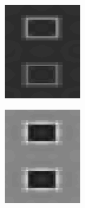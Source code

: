 \documentclass[journal,onecolumn]{IEEEtran}
\begin{document}
{\begin{figure}[H]
\begin{subfigure}[b]{0.2\textwidth}
            \caption{}
            \label{fig:test-crisp-dwt-1-rg}
    \end{subfigure}%
    \begin{subfigure}[b]{0.2\textwidth}
            \centering
            \includegraphics[width=.85\linewidth, frame]{test-crisp-dwt-2-rg}
            \caption{}
            \label{fig:test-crisp-dwt-2-rg}
    \end{subfigure}%
    \begin{subfigure}[b]{0.2\textwidth}
            \centering
            \includegraphics[width=.85\linewidth, frame]{test-crisp-dwt-3-rg}

\end{subfigure}
\end{figure}}
\end{document}
